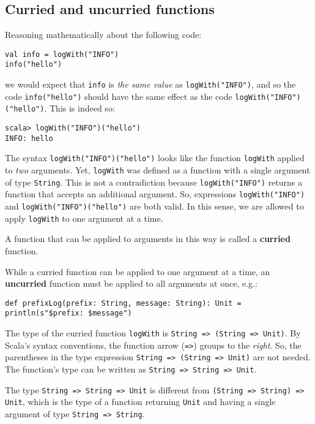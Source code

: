 \subsection{Curried and uncurried functions}

Reasoning mathematically about the following code:
\begin{lstlisting}
val info = logWith("INFO")
info("hello")
\end{lstlisting}
we would expect that \lstinline!info! is \emph{the same value} as
\lstinline!logWith("INFO")!, and so the code \lstinline!info("hello")!
should have the same effect as the code \lstinline!logWith("INFO")("hello")!.
This is indeed so:
\begin{lstlisting}
scala> logWith("INFO")("hello")
INFO: hello
\end{lstlisting}
The syntax \lstinline!logWith("INFO")("hello")! looks like the function
\lstinline!logWith! applied to \emph{two} arguments. Yet, \lstinline!logWith!
was defined as a function with a single argument of type \lstinline!String!.
This is not a contradiction because \lstinline!logWith("INFO")! returns
a function that accepts an additional argument. So, expressions \lstinline!logWith("INFO")!
and \lstinline!logWith("INFO")("hello")! are both valid. In this
sense, we are allowed to apply \lstinline!logWith! to one argument
at a time.

A function that can be applied to arguments in this way is called
a \textbf{curried} function. 

While a curried function can be applied to one argument at a time,
an \textbf{uncurried} function must be
applied to all arguments at once, e.g.:
\begin{lstlisting}
def prefixLog(prefix: String, message: String): Unit = println(s"$prefix: $message")
\end{lstlisting}

The type of the curried function \lstinline!logWith! is \lstinline!String => (String => Unit)!.
By Scala\textsf{'}s syntax conventions, the function arrow (\lstinline!=>!)
groups to the \emph{right}. So, the parentheses in the type expression
\lstinline!String => (String => Unit)! are not needed. The function\textsf{'}s
type can be written as \lstinline!String => String => Unit!.

The type \lstinline!String => String => Unit! is different from \lstinline!(String => String) => Unit!,
which is the type of a function returning \lstinline!Unit! and having
a single argument of type \lstinline!String => String!. 

